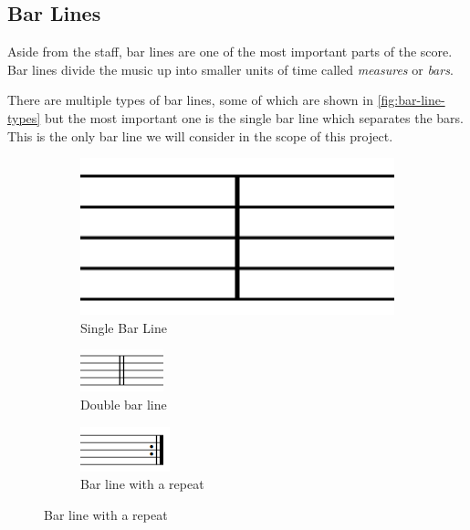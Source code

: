 \subsection{Bar Lines}

Aside from the staff, bar lines are one of the most important parts of the score. Bar lines divide the music up into smaller units of time called \emph{measures} or \emph{bars}.

There are multiple types of bar lines, some of which are shown in \cref{fig:bar-line-types} but the most important one is the single bar line which separates the bars. This is the only bar line we will consider in the scope of this project.

\begin{figure}[H]
  \centering

  \begin{subfigure}[b]{.3\linewidth}
      \centering
      \includegraphics[width=.7\linewidth]{gfx/music-theory/barline-single.png}
      \caption{Single Bar Line}
      \label{fig:single-bar-line}
  \end{subfigure}
  \begin{subfigure}[b]{.3\linewidth}
      \centering
      \includegraphics[width=.7\linewidth]{gfx/music-theory/barline-double.png}
      \caption{Double bar line}
      \label{fig:double-bar-line}
  \end{subfigure}
  \begin{subfigure}[b]{.3\linewidth}
      \centering
      \includegraphics[width=.7\linewidth]{gfx/music-theory/barline-end-repeat.png}
      \caption{Bar line with a repeat}
      \label{fig:repeat-bar-line}
  \end{subfigure}


\end{figure}
